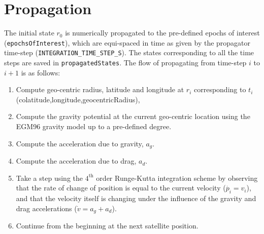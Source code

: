 \documentclass[11pt,a4paper,oneside]{report}
\begin{document}

\section{Propagation}
The initial state $r_0$ is numerically propagated to the pre-defined epochs of interest (\verb|epochsOfInterest|), which are equi-spaced in time as given by the
propagator time-step (\verb|INTEGRATION_TIME_STEP_S|). The states corresponding to all the time steps are saved in \verb|propagatedStates|. The flow of propagating
from time-step $i$ to $i+1$ is as follows:
\begin{enumerate}
	\item Compute geo-centric radius, latitude and longitude at $r_i$ corresponding to $t_i$ (colatitude,longitude,geocentricRadius),
	\item Compute the gravity potential at the current geo-centric location using the EGM96 gravity model up to a pre-defined degree.
	\item Compute the acceleration due to gravity, $a_g$.
	\item Compute the acceleration due to drag, $a_d$.
	\item Take a step using the $4^{\mathrm{th}}$ order Runge-Kutta integration scheme by observing that the rate of change of position is equal to the current velocity ($\dot{p_i} = v_i$),
	and that the velocity itself is changing under the influence of the gravity and drag accelerations ($\dot{v} = a_g + a_d$).
	\item Continue from the beginning at the next satellite position.
\end{enumerate}
\end{document}
